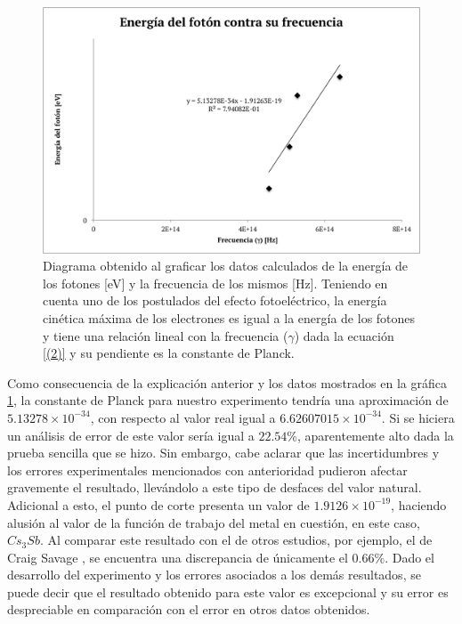 \documentclass[%
 reprint,
 amsmath,amssymb,
 aps,
]{revtex4-1}
\begin{document}
\begin{figure}[H]
    \centering
    \includegraphics[scale=0.40]{energiavsfrecuencia.png}
    \caption{Diagrama obtenido al graficar los datos calculados de la energía de los fotones [eV] y la frecuencia de los mismos [Hz]. Teniendo en cuenta uno de los postulados del efecto fotoeléctrico, la energía cinética máxima de los electrones es igual a la energía de los fotones y tiene una relación lineal con la frecuencia ($\gamma$) dada la ecuación \eqref{(2)} y su pendiente es la constante de Planck.}
    \label{fig:constante de Planck}
\end{figure}

Como consecuencia de la explicación anterior y los datos mostrados en la gráfica \ref{fig:constante de Planck}, la constante de Planck para nuestro experimento tendría una aproximación de $5.13278 \times 10^{-34}$, con respecto al valor real igual a $6.62607015 \times 10^{-34}$. Si se hiciera un análisis de error de este valor sería igual a $22.54 \%$, aparentemente alto dada la prueba sencilla que se hizo. Sin embargo, cabe aclarar que las incertidumbres y los errores experimentales mencionados con anterioridad pudieron afectar gravemente el resultado, llevándolo a este tipo de desfaces del valor natural. Adicional a esto, el punto de corte presenta un valor de $1.9126 \times 10^{-19}$, haciendo alusión al valor de la función de trabajo del metal en cuestión, en este caso, $Cs_3Sb$. Al comparar este resultado con el de otros estudios, por ejemplo, el de Craig Savage \cite{funcion_de_trabajo_del_metal}, se encuentra una discrepancia de únicamente el $0.66 \%$. Dado el desarrollo del experimento y los errores asociados a los demás resultados, se puede decir que el resultado obtenido para este valor es excepcional y su error es despreciable en comparación con el error en otros datos obtenidos.
\end{document}

